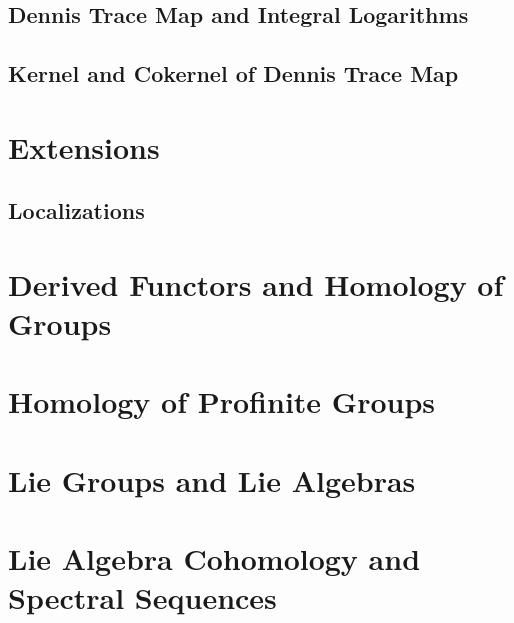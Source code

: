 \documentclass{report}
\begin{document}
\section{Dennis Trace Map and Integral Logarithms}

\section{Kernel and Cokernel of Dennis Trace Map}

\chapter{Extensions\label{Extensions}}
\section{Localizations}

\begin{appendix}\label{Appendices}
\chapter{Derived Functors and Homology of Groups}



\chapter{Homology of Profinite Groups}


\chapter{Lie Groups and Lie Algebras}


\chapter{Lie Algebra Cohomology and Spectral Sequences}

\end{appendix}
\end{document}
